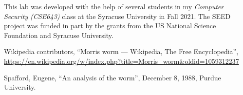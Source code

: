 This lab was developed with the help of several students 
in my \textit{Computer Security (CSE643)} class 
at the Syracuse University in Fall 2021. 
The SEED project was funded in part 
by the grants from the US National Science Foundation
and Syracuse University.


\begin{thebibliography}{90}

Wikipedia contributors, ``Morris worm --- Wikipedia, The Free Encyclopedia'', 
\url{https://en.wikipedia.org/w/index.php?title=Morris_worm&oldid=1059312237}

Spafford, Eugene, ``An analysis of the worm'', December 8, 1988, Purdue University. 
\end{thebibliography}




